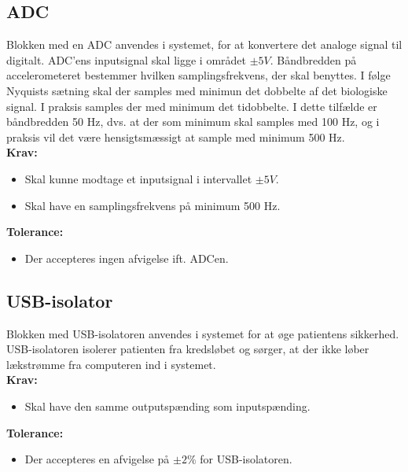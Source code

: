 \subsection{ADC}
Blokken med en ADC anvendes i systemet, for at konvertere det analoge signal til digitalt. %
ADC'ens inputsignal skal ligge i området $\pm 5 V$. Båndbredden på accelerometeret bestemmer hvilken samplingsfrekvens, der skal benyttes. I følge Nyquists sætning skal der samples med minimun det dobbelte af det biologiske signal. I praksis samples der med minimum det tidobbelte. I dette tilfælde er båndbredden 50 Hz, dvs. at der som minimum skal samples med 100 Hz, og i praksis vil det være hensigtsmæssigt at sample med minimum 500 Hz. \\
\textbf{Krav:}
\begin{itemize}
\item Skal kunne modtage et inputsignal i intervallet $\pm 5 V$.
\item Skal have en samplingsfrekvens på minimum 500 Hz.
\end{itemize}
\textbf{Tolerance:}
\begin{itemize}
\item Der accepteres ingen afvigelse ift. ADCen.
\end{itemize}
\subsection{USB-isolator}\label{kravspecifikationer_USB}
Blokken med USB-isolatoren anvendes i systemet for at øge patientens sikkerhed. USB-isolatoren isolerer patienten fra kredsløbet og sørger, at der ikke løber lækstrømme fra computeren ind i systemet.\\
\textbf{Krav:}
\begin{itemize}
\item Skal have den samme outputspænding som inputspænding. 
\end{itemize}
\textbf{Tolerance:}
\begin{itemize}
\item Der accepteres en afvigelse på $\pm 2 \%$ for USB-isolatoren. 
\end{itemize}
